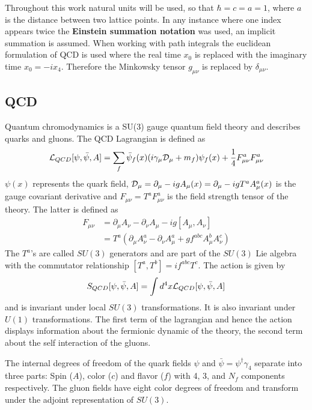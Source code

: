 Throughout this work natural units will be used, so that $\hbar = c = a = 1$, where $a$ is the distance between two lattice points.	In any instance where one index appears twice the \textbf{Einstein summation notation} was used, an implicit summation is assumed. When working with path integrals the euclidean formulation of QCD is used where the real time $x_0$ is replaced with the imaginary time $x_0 = -ix_4$. Therefore the Minkowsky tensor $g_{\mu\nu}$ is replaced by $\delta_{\mu\nu}$.
	
\subsection{QCD}
	Quantum chromodynamics is a SU(3) gauge quantum field theory and describes quarks and gluons. The QCD Lagrangian is defined as \cite{qcd1_script_philipsen}
	\begin{equation}
	    \mathcal{L}_{QCD}[\psi,\bar{\psi}, A] = \sum_f \bar{\psi}_f(x)(i\gamma_\mu\mathcal{D}_\mu + m_f)\psi_f(x) + \frac{1}{4}F^a_{\mu\nu}F^a_{\mu\nu}
	    \label{qcd_lagrangian}
	\end{equation}
	$\psi(x)$ represents the quark field, $\mathcal{D}_\mu = \partial_\mu - igA_\mu(x) = \partial_\mu-igT^aA^a_\mu(x)$ is the gauge covariant derivative and $F_{\mu\nu} = T^aF^a_{\mu\nu}$ is the field strength tensor of the theory. The latter is defined as
	\begin{equation}\label{strenth_tensor}
	\begin{aligned}
	    F_{\mu\nu} &= \partial_\mu A_\nu - \partial_\nu A_\mu-ig[A_\mu,A_\nu]\\
	    &= T^a(\partial_\mu A^a_\nu - \partial_\nu A^a_\mu + g f^{abc}A^b_\mu A^c_\nu)
	\end{aligned}
	\end{equation}
	\noindent
	The $T^a$'s are called $SU(3)$ generators and are part of the $SU(3)$ Lie algebra with the commutator relationship $[T^a,T^b]=if^{abc}T^c$. The action is given by
	\begin{equation}
	    S_{QCD}[\psi,\bar{\psi}, A] = \int d^4x \mathcal{L}_{QCD}[\psi,\bar{\psi}, A]
	\end{equation}
	and is invariant under local $SU(3)$ transformations. It is also invariant under $U(1)$ transformations. The first term of the lagrangian and hence the action displays information about the fermionic dynamic of the theory, the second term about the self interaction of the gluons.
	
	The internal degrees of freedom of the quark fields $\psi$ and $\bar{\psi}=\psi^\dagger\gamma_4$ separate into three parts: Spin ($A$), color ($c$) and flavor ($f$) with 4, 3, and $N_f$ components respectively. The gluon fields have eight color degrees of freedom and transform under the adjoint representation of $SU(3)$.